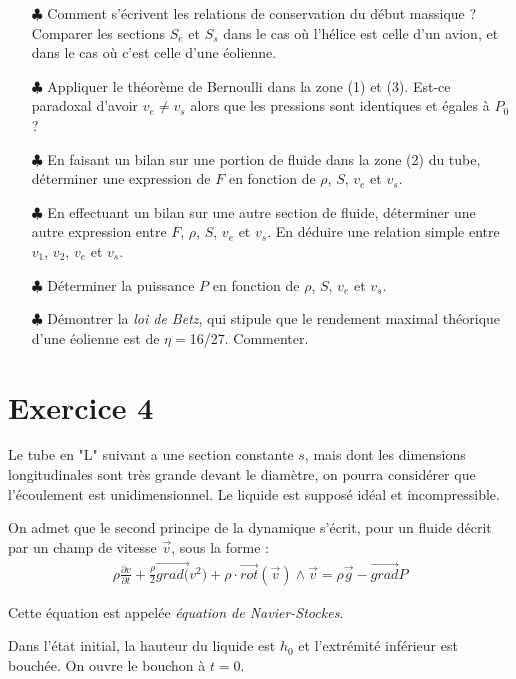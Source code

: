 \documentclass{report}
\begin{document}
\begin{itemize}
	\item[$\clubsuit$] Comment s'écrivent les relations de conservation du début massique ? Comparer les sections $S_e$ et $S_s$ dans le cas où l'hélice est celle d'un avion, et dans le cas où c'est celle d'une éolienne. 
	\item[$\clubsuit$] Appliquer le théorème de Bernoulli dans la zone (1) et (3). Est-ce paradoxal d'avoir $v_e\neq v_s$ alors que les pressions sont identiques et égales à $P_0$ ?
	\item[$\clubsuit$] En faisant un bilan sur une portion de fluide dans la zone (2) du tube, déterminer une expression de $F$ en fonction de $\rho$, $S$, $v_e$ et $v_s$.
	\item[$\clubsuit$] En effectuant un bilan sur une autre section de fluide, déterminer une autre expression entre $F$, $\rho$, $S$, $v_e$ et $v_s$. En déduire une relation simple entre $v_1$, $v_2$, $v_e$ et $v_s$.
	\item[$\clubsuit$] Déterminer la puissance $P$ en fonction de $\rho$, $S$, $v_e$ et $v_s$. 
	
	\item[$\clubsuit$] Démontrer la \textit{loi de Betz}, qui stipule que le rendement maximal théorique d'une éolienne est de $\eta=$16/27. Commenter.
	
\end{itemize}

\section*{Exercice 4}

Le tube en "L" suivant a une section constante $s$, mais dont les dimensions longitudinales sont très grande devant le diamètre, on pourra considérer que l'écoulement est unidimensionnel. Le liquide est supposé idéal et incompressible.

On admet que le second principe de la dynamique s'écrit, pour un fluide décrit par un champ de vitesse $\vec{v}$, sous la forme :
	\begin{align*}
		\rho\frac{\partial v}{\partial t} +\frac{\rho}{2}\vec{grad(}v^2)+\rho\cdot \vec{rot}(\vec{v})\wedge\vec{v} =\rho\vec{g}-\vec{grad}P
	\end{align*}

Cette équation est appelée \textit{équation de Navier-Stockes}.

Dans l'état initial, la hauteur du liquide est $h_0$ et l'extrémité inférieur est bouchée. On ouvre le bouchon à $t=0$.
\end{document}
